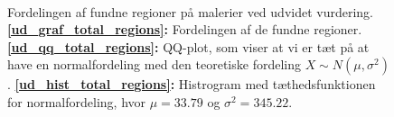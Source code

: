 {\begin{figure}[!h]
    \centering
    \\
    \caption[]{Fordelingen af fundne regioner på malerier ved udvidet
    vurdering.
    \textbf{\ref{ud_graf_total_regions}:} Fordelingen af de fundne
    regioner.
    \textbf{\ref{ud_qq_total_regions}:} QQ-plot, som viser at vi er tæt
    på at have en normalfordeling med den teoretiske fordeling $X \sim N(\mu,
    \sigma^2)$.
    \textbf{\ref{ud_hist_total_regions}:} Histrogram med
    tæthedsfunktionen for normalfordeling, hvor $\mu = 33.79$ og
    $\sigma^2 = 345.22$.
    }
    \label{ud_total_regions_plots}
\end{figure}

} %

